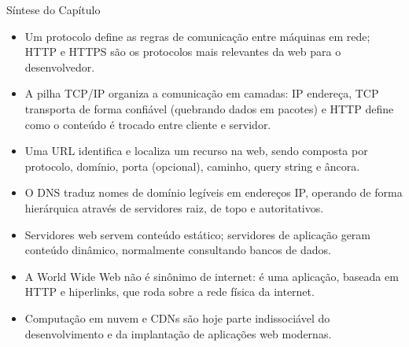 Síntese do Capítulo

\begin{itemize}
  \item Um protocolo define as regras de comunicação entre máquinas em rede; HTTP e HTTPS são os protocolos mais relevantes da web para o desenvolvedor.
\end{itemize}

\begin{itemize}
  \item A pilha TCP/IP organiza a comunicação em camadas: IP endereça, TCP transporta de forma confiável (quebrando dados em pacotes) e HTTP define como o conteúdo é trocado entre cliente e servidor.
\end{itemize}

\begin{itemize}
  \item Uma URL identifica e localiza um recurso na web, sendo composta por protocolo, domínio, porta (opcional), caminho, query string e âncora.
\end{itemize}

\begin{itemize}
  \item O DNS traduz nomes de domínio legíveis em endereços IP, operando de forma hierárquica através de servidores raiz, de topo e autoritativos.
\end{itemize}

\begin{itemize}
  \item Servidores web servem conteúdo estático; servidores de aplicação geram conteúdo dinâmico, normalmente consultando bancos de dados.
\end{itemize}

\begin{itemize}
  \item A World Wide Web não é sinônimo de internet: é uma aplicação, baseada em HTTP e hiperlinks, que roda sobre a rede física da internet.
\end{itemize}

\begin{itemize}
  \item Computação em nuvem e CDNs são hoje parte indissociável do desenvolvimento e da implantação de aplicações web modernas.
\end{itemize}
